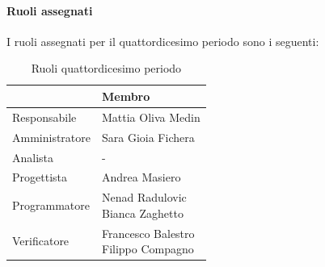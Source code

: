 \documentclass[a4paper,12pt]{article}
\begin{document}
            \paragraph{Ruoli assegnati}
            I ruoli assegnati per il quattordicesimo periodo sono i seguenti:
                \begin{table}[H]
                \centering
                \caption{Ruoli quattordicesimo periodo}
                \begin{tabular}{|l|l|}
                \hline
                    \rowcolor{lightgray}{\textbf{Ruolo}} & {\textbf{Membro}} \\
                \hline
                    Responsabile & Mattia Oliva Medin \\
                \hline
                    Amministratore & Sara Gioia Fichera \\
                \hline
                    Analista & - \\
                \hline
                    Progettista & Andrea Masiero \\
                \hline
                    Programmatore & \makecell[l]{ Nenad Radulovic\\ Bianca Zaghetto } \\
                \hline
                    Verificatore & \makecell[l]{ Francesco Balestro \\ Filippo Compagno } \\
                \hline
                \end{tabular}
                \end{table}
                
\end{document}
